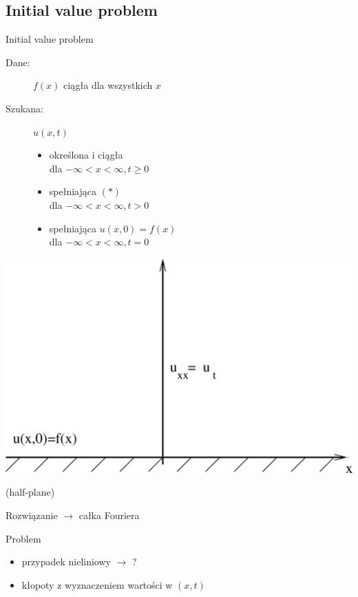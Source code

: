 \subsection{Initial value problem}

\begin{frame}{Initial value problem}
  \begin{description}
    \item[Dane:]
      $f(x)$ ciągła dla wszystkich $x$
    \item[Szukana:]
      $u(x,t)$
      \begin{itemize}
        \item określona i ciągła \\ dla $-\infty < x < \infty, t \ge 0$
        \item spełniająca $(*)$ \\ dla $-\infty < x < \infty, t > 0$
        \item spełniająca $u(x,0) = f(x)$ \\ dla $-\infty < x < \infty, t = 0$
      \end{itemize}
  \end{description}
\end{frame}

\begin{frame}
  \centerline{\includegraphics[height = 0.85 \textheight]{img/23/ivp}}
  (half-plane)
\end{frame}

\begin{frame}
  Rozwiązanie $\rightarrow$ całka Fouriera
  \begin{alertblock}{Problem}
    \begin{itemize}
      \item przypadek nieliniowy $\rightarrow$ ?
      \item kłopoty z wyznaczeniem wartości w $(x,t)$
    \end{itemize}
  \end{alertblock}
\end{frame}
